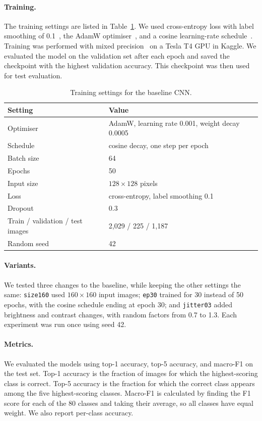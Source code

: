 \documentclass[twoside,a4paper,11pt]{article}
\begin{document}
\paragraph{Training.} The training settings are listed in Table~\ref{tab:cnncfg}. We used cross-entropy loss with label smoothing of 0.1~\cite{szegedy2016rethinking}, the AdamW optimiser~\cite{loshchilov2019adamw}, and a cosine learning-rate schedule~\cite{loshchilov2017sgdr}. Training was performed with mixed precision~\cite{micikevicius2018mixed} on a Tesla T4 GPU in Kaggle. We evaluated the model on the validation set after each epoch and saved the checkpoint with the highest validation accuracy. This checkpoint was then used for test evaluation.

\begin{table}[t]
\centering
\begin{tabular}{ll}
\toprule
Setting & Value \\
\midrule
Optimiser & AdamW, learning rate 0.001, weight decay 0.0005 \\
Schedule & cosine decay, one step per epoch \\
Batch size & 64 \\
Epochs & 50 \\
Input size & $128\times128$ pixels \\
Loss & cross-entropy, label smoothing 0.1 \\
Dropout & 0.3 \\
Train / validation / test images & 2{,}029 / 225 / 1{,}187 \\
Random seed & 42 \\
\bottomrule
\end{tabular}
\caption{Training settings for the baseline CNN.}
\label{tab:cnncfg}
\end{table}

\paragraph{Variants.} We tested three changes to the baseline, while keeping the other settings the same: \texttt{size160} used $160\times160$ input images; \texttt{ep30} trained for 30 instead of 50 epochs, with the cosine schedule ending at epoch 30; and \texttt{jitter03} added brightness and contrast changes, with random factors from 0.7 to 1.3. Each experiment was run once using seed 42.

\paragraph{Metrics.} We evaluated the models using top-1 accuracy, top-5 accuracy, and macro-F1 on the test set. Top-1 accuracy is the fraction of images for which the highest-scoring class is correct. Top-5 accuracy is the fraction for which the correct class appears among the five highest-scoring classes. Macro-F1 is calculated by finding the F1 score for each of the 80 classes and taking their average, so all classes have equal weight. We also report per-class accuracy.
\end{document}
